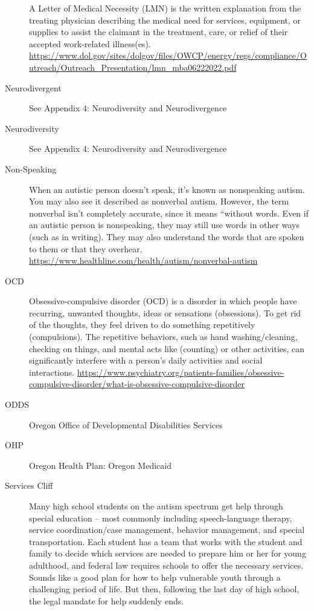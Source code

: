 \documentclass[
  letterpaper,
  DIV=11,
  numbers=noendperiod]{scrreprt}
\begin{document}
\begin{description}
A Letter of Medical Necessity (LMN) is the written explanation from the
treating physician describing the medical need for services, equipment,
or supplies to assist the claimant in the treatment, care, or relief of
their accepted work-related illness(es).
\url{https://www.dol.gov/sites/dolgov/files/OWCP/energy/regs/compliance/Outreach/Outreach_Presentation/lmn_mba06222022.pdf}
\item[Neurodivergent]
See Appendix 4: Neurodiversity and Neurodivergence
\item[Neurodiversity]
See Appendix 4: Neurodiversity and Neurodivergence
\item[Non-Speaking]
When an autistic person doesn't speak, it's known as nonspeaking autism.
You may also see it described as nonverbal autism. However, the term
nonverbal isn't completely accurate, since it means ``without words.
Even if an autistic person is nonspeaking, they may still use words in
other ways (such as in writing). They may also understand the words that
are spoken to them or that they overhear.
\url{https://www.healthline.com/health/autism/nonverbal-autism}
\item[OCD]
Obsessive-compulsive disorder (OCD) is a disorder in which people have
recurring, unwanted thoughts, ideas or sensations (obsessions). To get
rid of the thoughts, they feel driven to do something repetitively
(compulsions). The repetitive behaviors, such as hand washing/cleaning,
checking on things, and mental acts like (counting) or other activities,
can significantly interfere with a person's daily activities and social
interactions.
\url{https://www.psychiatry.org/patients-families/obsessive-compulsive-disorder/what-is-obsessive-compulsive-disorder}
\item[ODDS]
Oregon Office of Developmental Disabilities Services
\item[OHP]
Oregon Health Plan: Oregon Medicaid
\item[Services Cliff]
Many high school students on the autism spectrum get help through
special education -- most commonly including speech-language therapy,
service coordination/case management, behavior management, and special
transportation. Each student has a team that works with the student and
family to decide which services are needed to prepare him or her for
young adulthood, and federal law requires schools to offer the necessary
services. Sounds like a good plan for how to help vulnerable youth
through a challenging period of life. But then, following the last day
of high school, the legal mandate for help suddenly ends.

\end{description}
\end{document}
